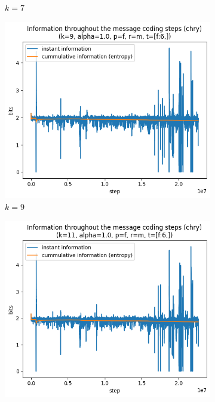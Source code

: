 \documentclass{article}
\begin{document}
\begin{figure}
\begin{subfigure}[b]{0.3\textwidth}
\begin{center}
        \end{center}
        \caption{$k = 7$}
        \label{fig:results-pattern-size-7}
    \end{subfigure}
    \hfill
    \begin{subfigure}[b]{0.3\textwidth}
        \begin{center}
            \includegraphics[width=1.0\linewidth]{../scripts/images/chry_9_1.0_f_m_[f:6,].png}
        \end{center}
        \caption{$k = 9$}
        \label{fig:results-pattern-size-9}
    \end{subfigure}
    \begin{subfigure}[b]{0.3\textwidth}
        \begin{center}
            \includegraphics[width=1.0\linewidth]{../scripts/images/chry_11_1.0_f_m_[f:6,].png}

\end{center}
\end{subfigure}
\end{figure}
\end{document}

